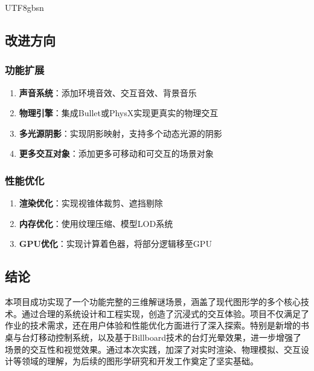 \documentclass{article}
\begin{document}
\begin{CJK}{UTF8}{gbsn}
\subsection{改进方向}

\subsubsection{功能扩展}
\begin{enumerate}
    \item \textbf{声音系统}：添加环境音效、交互音效、背景音乐
    \item \textbf{物理引擎}：集成Bullet或PhysX实现更真实的物理交互
    \item \textbf{多光源阴影}：实现阴影映射，支持多个动态光源的阴影
    \item \textbf{更多交互对象}：添加更多可移动和可交互的场景对象
\end{enumerate}

\subsubsection{性能优化}
\begin{enumerate}
    \item \textbf{渲染优化}：实现视锥体裁剪、遮挡剔除
    \item \textbf{内存优化}：使用纹理压缩、模型LOD系统
    \item \textbf{GPU优化}：实现计算着色器，将部分逻辑移至GPU
\end{enumerate}

\subsection{结论}

本项目成功实现了一个功能完整的三维解谜场景，涵盖了现代图形学的多个核心技术。通过合理的系统设计和工程实现，创造了沉浸式的交互体验。项目不仅满足了作业的技术需求，还在用户体验和性能优化方面进行了深入探索。特别是新增的书桌与台灯移动控制系统，以及基于Billboard技术的台灯光晕效果，进一步增强了场景的交互性和视觉效果。通过本次实践，加深了对实时渲染、物理模拟、交互设计等领域的理解，为后续的图形学研究和开发工作奠定了坚实基础。

\end{CJK}
\end{document}
